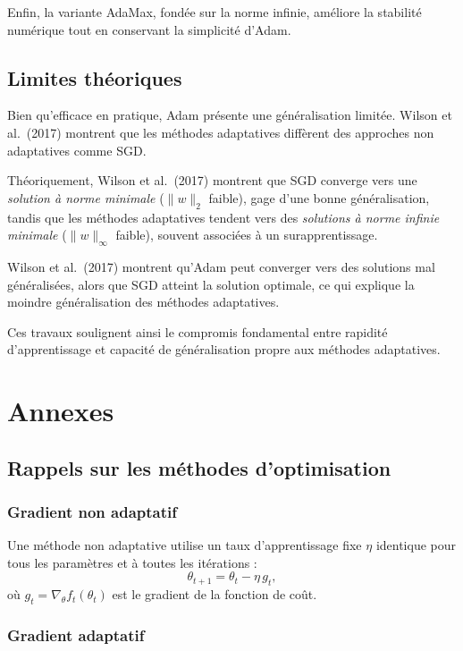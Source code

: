 \documentclass[a4paper,12pt]{article}
\begin{document}
Enfin, la variante AdaMax, fondée sur la norme infinie, améliore la stabilité numérique tout en conservant la simplicité d’Adam.

\subsection{Limites théoriques}

Bien qu’efficace en pratique, Adam présente une généralisation
limitée. Wilson et al.\ (2017) montrent que les méthodes adaptatives
diffèrent des approches non adaptatives comme SGD.

Théoriquement, Wilson et al.\ (2017) montrent que SGD converge vers une
\emph{solution à norme minimale} ($\|w\|_2$ faible), gage d’une bonne
généralisation, tandis que les méthodes adaptatives tendent vers des
\emph{solutions à norme infinie minimale} ($\|w\|_\infty$ faible),
souvent associées à un surapprentissage.

Wilson et al.\ (2017) montrent qu’Adam peut converger vers des solutions
mal généralisées, alors que SGD atteint la solution optimale, ce qui
explique la moindre généralisation des méthodes adaptatives.

Ces travaux soulignent ainsi le compromis fondamental entre rapidité d’apprentissage et capacité de généralisation propre aux méthodes adaptatives.



\appendix
\section{Annexes}

\subsection{Rappels sur les méthodes d’optimisation}

\subsubsection{Gradient non adaptatif}

Une méthode non adaptative utilise un taux d'apprentissage fixe $\eta$ identique pour tous les paramètres
et à toutes les itérations :
\[
\theta_{t+1} = \theta_t - \eta \, g_t,
\]
où $g_t = \nabla_\theta f_t(\theta_t)$ est le gradient de la fonction de coût.

\subsubsection{Gradient adaptatif}
\end{document}
